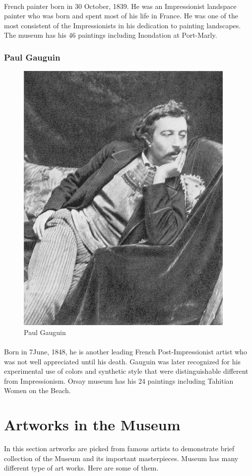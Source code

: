 \documentclass[
10pt, %
a4paper, %
oneside, %
headinclude,footinclude, %
BCOR5mm, %
]{scrartcl}
\theoremstyle{definition} %
\theoremstyle{plain} %
\theoremstyle{remark} %
\begin{document}
\paragraph{}
French painter born in 30 October, 1839. He was an Impressionist landspace painter who was born and spent most of his life in France. He was one of the most consistent of the Impressionists in his dedication to painting landscapes. The museum has his 46 paintings including Inondation at Port-Marly.


\subsubsection{Paul Gauguin}
\begin{figure}[tbH]
\centering
\includegraphics[width=.30\columnwidth]{Images/16.png}
\caption[Paul Gauguin]{Paul Gauguin} %
\label{fig:gauguin}
\end{figure}

\paragraph{}
Born in 7June, 1848, he is another leading French Post-Impressionist artist who was not well appreciated until his death. Gauguin was later recognized for his experimental use of colors and synthetic style that were distinguishable different from Impressionism. Orsay museum has his 24 paintings including Tahitian Women on the Beach.


\section{Artworks in the Museum}
In this section artworks are picked from famous artists to demonstrate brief collection of the Museum and its important masterpieces. Museum has many different type of art works. Here are some of them.
\end{document}
